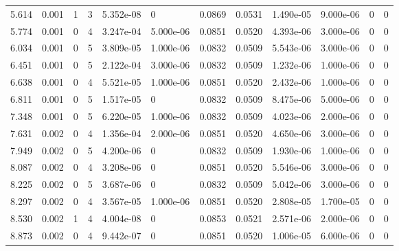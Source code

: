 \documentclass[preview]{standalone}
\begin{document}
{{\begin{tabular}{L{1.2cm}C{1.2cm} C{0.3cm}C{0.5cm} C{1.4cm}C{1.4cm} C{1.4cm}C{1.4cm} C{1.6cm}C{1.6cm} C{1.6cm}C{1.6cm}}
  5.614  &  0.001  & 1     &  3 &  5.352e-08  & 0  &  0.0869&   0.0531& 1.490e-05 & 9.000e-06   &  0 & 0  \\ 
  5.774  &  0.001  & 0     &  4 &  3.247e-04  & 5.000e-06  &  0.0851&   0.0520& 4.393e-06 & 3.000e-06   &  0 & 0  \\ 
  6.034  &  0.001  & 0     &  5 &  3.809e-05  & 1.000e-06  &  0.0832&   0.0509& 5.543e-06 & 3.000e-06   &  0 & 0  \\ 
  6.451  &  0.001  & 0     &  5 &  2.122e-04  & 3.000e-06  &  0.0832&   0.0509& 1.232e-06 & 1.000e-06   &  0 & 0  \\ 
  6.638  &  0.001  & 0     &  4 &  5.521e-05  & 1.000e-06  &  0.0851&   0.0520& 2.432e-06 & 1.000e-06   &  0 & 0  \\ 
  6.811  &  0.001  & 0     &  5 &  1.517e-05  & 0  &  0.0832&   0.0509& 8.475e-06 & 5.000e-06   &  0 & 0  \\ 
  7.348  &  0.001  & 0     &  5 &  6.220e-05  & 1.000e-06  &  0.0832&   0.0509& 4.023e-06 & 2.000e-06   &  0 & 0  \\ 
  7.631  &  0.002  & 0     &  4 &  1.356e-04  & 2.000e-06  &  0.0851&   0.0520& 4.650e-06 & 3.000e-06   &  0 & 0  \\ 
  7.949  &  0.002  & 0     &  5 &  4.200e-06  & 0  &  0.0832&   0.0509& 1.930e-06 & 1.000e-06   &  0 & 0  \\ 
  8.087  &  0.002  & 0     &  4 &  3.208e-06  & 0  &  0.0851&   0.0520& 5.546e-06 & 3.000e-06   &  0 & 0  \\ 
  8.225  &  0.002  & 0     &  5 &  3.687e-06  & 0  &  0.0832&   0.0509& 5.042e-06 & 3.000e-06   &  0 & 0  \\ 
  8.297  &  0.002  & 0     &  4 &  3.567e-05  & 1.000e-06  &  0.0851&   0.0520& 2.808e-05 & 1.700e-05   &  0 & 0  \\ 
  8.530  &  0.002  & 1     &  4 &  4.004e-08  & 0  &  0.0853&   0.0521& 2.571e-06 & 2.000e-06   &  0 & 0  \\ 
  8.873  &  0.002  & 0     &  4 &  9.442e-07  & 0  &  0.0851&   0.0520& 1.006e-05 & 6.000e-06   &  0 & 0  \\ 
\hline 
\end{tabular} 

}}
\end{document}
